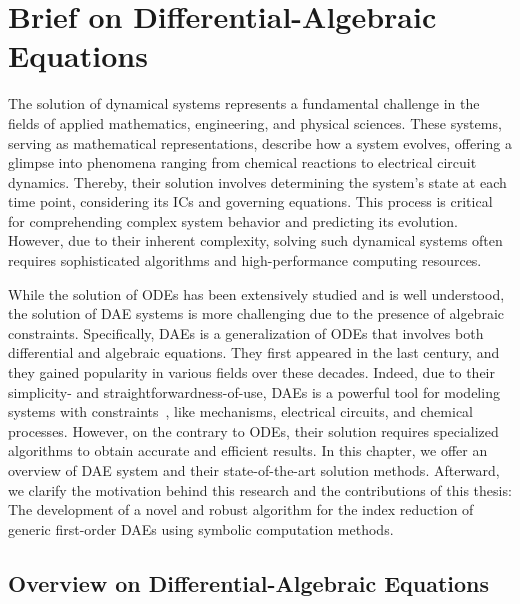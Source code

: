 
\chapter[Brief on DAEs]{Brief on Differential-Algebraic Equations}
\label{chap2:brief_daes}

The solution of dynamical systems represents a fundamental challenge in the fields of applied mathematics, engineering, and physical sciences. These systems, serving as mathematical representations, describe how a system evolves, offering a glimpse into phenomena ranging from chemical reactions to electrical circuit dynamics. Thereby, their solution involves determining the system's state at each time point, considering its \acp{IC} and governing equations. This process is critical for comprehending complex system behavior and predicting its evolution. However, due to their inherent complexity, solving such dynamical systems often requires sophisticated algorithms and high-performance computing resources.

While the solution of \acp{ODE} has been extensively studied and is well understood, the solution of \ac{DAE} systems is more challenging due to the presence of algebraic constraints. Specifically, \acp{DAE} is a generalization of \acp{ODE} that involves both differential and algebraic equations. They first appeared in the last century, and they gained popularity in various fields over these decades. Indeed, due to their simplicity- and straightforwardness-of-use, \acp{DAE} is a powerful tool for modeling systems with constraints~\cite{burger2018dae}, like mechanisms, electrical circuits, and chemical processes. However, on the contrary to \acp{ODE}, their solution requires specialized algorithms to obtain accurate and efficient results. In this chapter, we offer an overview of \ac{DAE} system and their state-of-the-art solution methods. Afterward, we clarify the motivation behind this research and the contributions of this thesis: The development of a novel and robust algorithm for the index reduction of generic first-order \acp{DAE} using symbolic computation methods.


\section{Overview on Differential-Algebraic Equations}

